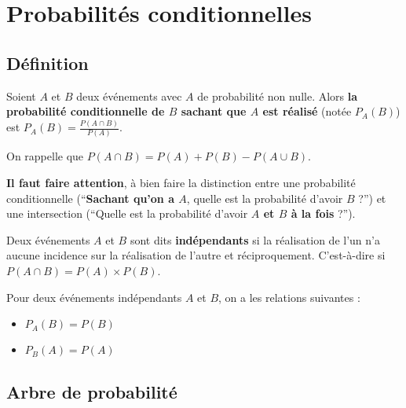 



	\section{Probabilités conditionnelles}

	\subsection{Définition}

	\begin{formula}[Définition]
		Soient $A$ et $B$ deux événements avec $A$ de probabilité non nulle. Alors \textbf{la probabilité conditionnelle de $B$ sachant que $A$ est réalisé} (notée $P_{A}(B)$) est $\displaystyle{P_{A}(B) = \frac{P(A \cap B)}{P(A)}}$.
	\end{formula}

	\begin{tip}[Rappel]
		On rappelle que $P(A \cap B) = P(A) + P(B) - P(A \cup B)$.
	\end{tip}

	\begin{tip}
		\textbf{Il faut faire attention}, à bien faire la distinction entre une probabilité conditionnelle (``\textbf{Sachant qu'on a $A$}, quelle est la probabilité d'avoir $B$ ?'') et une intersection (``Quelle est la probabilité d'avoir \textbf{$A$ et $B$ à la fois} ?'').
	\end{tip}

	\begin{formula}[Indépendance]
		Deux événements $A$ et $B$ sont dits \textbf{indépendants} si la réalisation de l'un n'a aucune incidence sur la réalisation de l'autre et réciproquement. C'est-à-dire si $P(A \cap B) = P(A) \times P(B)$.
	\end{formula}

	\begin{formula}[Propriétés]
		Pour deux événements indépendants $A$ et $B$, on a les relations suivantes :
		\begin{itemize}
			\item $P_{A}(B) = P(B)$
			\item $P_{B}(A) = P(A)$
		\end{itemize}
	\end{formula}

	\subsection{Arbre de probabilité}

